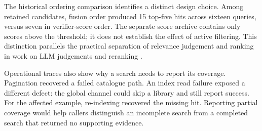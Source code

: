 The historical ordering comparison identifies a distinct design choice.
Among retained candidates, fusion order produced 15 top-five hits across
sixteen queries, versus seven in verifier-score order. The separate score
archive contains only scores above the threshold; it does not establish the
effect of active filtering. This distinction parallels the practical
separation of relevance judgement and ranking in work on
LLM judgements and reranking \citep{zheng-llmjudge,sun-urara}.

Operational traces also show why a search needs to report its coverage.
Pagination recovered a failed catalogue path. An index read failure exposed
a different defect: the global channel could skip a library and still report
success. For the affected example, re-indexing recovered the missing hit.
Reporting partial coverage would help callers distinguish an incomplete search
from a completed search that returned no supporting evidence.
